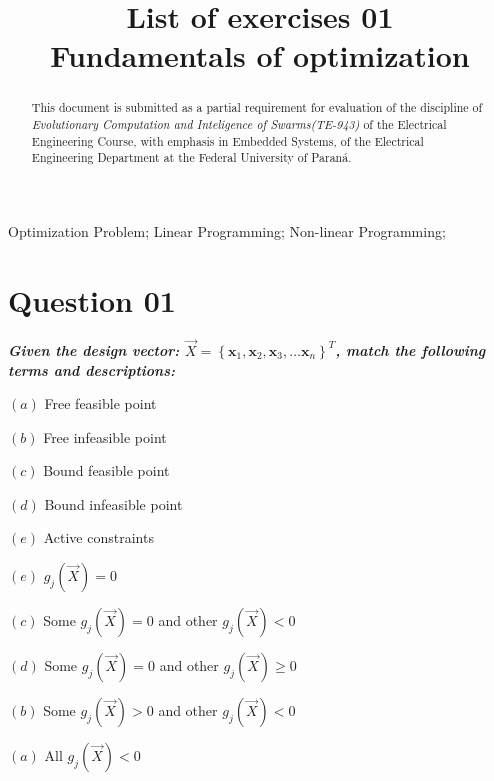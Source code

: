 \documentclass[conference]{IEEEtran}
\begin{document}
\title{List of exercises 01\\
	Fundamentals of optimization}
\author{
}


\maketitle

\begin{abstract}
	This document is submitted as a partial requirement for	evaluation of the discipline of \textit{Evolutionary Computation and Inteligence of Swarms(TE-943)} of the Electrical Engineering Course, with emphasis in Embedded Systems, of the Electrical Engineering Department at the Federal University of Paraná.
\end{abstract}


\begin{IEEEkeywords}Optimization Problem; Linear Programming; Non-linear Programming;\end{IEEEkeywords}

\section{Question 01}

\textbf{\textit{Given the design vector: $\vec{X} = \left\{ \mathbf{x}_{1}, \mathbf{x}_{2}, \mathbf{x}_{3}, \hdots \mathbf{x}_{n}\right\}^T$, match the following terms and descriptions:}}


\begin{multicols}{2}
	
	$(a)$ Free feasible point
	
	$(b)$ Free infeasible point
	
	$(c)$ Bound feasible point
	
	$(d)$ Bound infeasible point
	
	$(e)$ Active constraints
	
	\columnbreak
	
	$(e)$ $g_j(\vec{X}) = 0$
	
	$(c)$ Some $g_j(\vec{X}) = 0$ and other $g_j(\vec{X}) < 0$
	
	$(d)$ Some $g_j(\vec{X}) = 0$ and other $g_j(\vec{X}) \geq 0$
	
	$(b)$ Some $g_j(\vec{X})>0$ and other $g_j(\vec{X}) < 0$
	
	$(a)$ All $g_j(\vec{X}) < 0$
\end{multicols}
\end{document}
